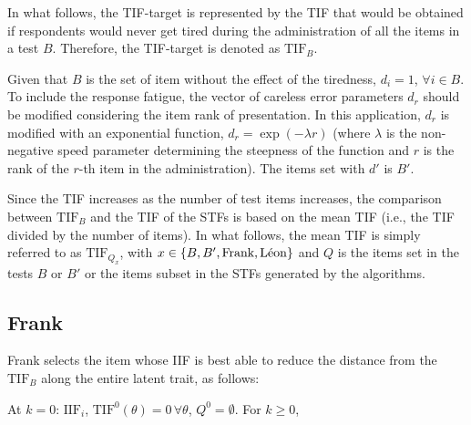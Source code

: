 \documentclass{svproc}
\begin{document}
In what follows, the TIF-target is represented by the TIF that would be obtained if respondents would never get tired during the administration of all the items in a test $B$. Therefore, the TIF-target is denoted as  $\text{TIF}_B$.

Given that $B$ is the set of item without the effect of the tiredness, $d_i = 1$, $\forall i \in B$. To include the response fatigue, the vector of careless error parameters $d_r$ should be modified considering the item rank of presentation. In this application, $d_r$ is modified with an exponential function, $d_r = \exp(-\lambda r)$ (where $\lambda$ is the non-negative speed parameter determining the steepness of the function and $r$ is the rank of the $r$-th item in the administration). 
The items set with $d'$ is $B'$.

Since the TIF increases as the number of test items increases, the comparison between $\text{TIF}_B$ and the TIF of the STFs is based on the mean TIF (i.e., the TIF divided by the number of items). In what follows, the mean TIF  is simply referred to as $\text{TIF}_{Q_x}$, with $x \in \{B, B', \text{Frank}, \text{\text{Léon}}\}$ and $Q$ is the items set in the tests $B$ or $B'$ or the items subset in the STFs generated by the algorithms.

\subsection{Frank}



Frank selects the item whose IIF is best able to reduce the distance from the $\text{TIF}_B$ along the entire latent trait, as follows:


At $k = 0$: $\text{IIF}_i$, $\text{TIF}^0(\theta) = 0 \, \forall \theta$, $Q^0 = \emptyset$. For $k \geq 0$,
\end{document}
